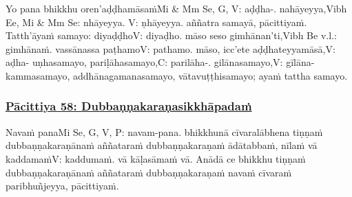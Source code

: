 Yo pana bhikkhu oren'aḍḍhamāsaṁ\makeatletter\hyperlink{endnote-appendix}\makeatother Mi & Mm Se, G, V: aḍḍha-. nahāyeyya,\makeatletter\hyperlink{endnote-appendix}\makeatother Vibh Ee, Mi & Mm Se: nhāyeyya. V: ṇhāyeyya. aññatra samayā, pācittiyaṁ. Tatth'āyaṁ samayo: diyaḍḍho\makeatletter\hyperlink{endnote-appendix}\makeatother V: diyaḍho. māso seso gimhānan'ti,\makeatletter\hyperlink{endnote-appendix}\makeatother Vibh Be v.l.: gimhānaṁ. vassānassa paṭhamo\makeatletter\hyperlink{endnote-appendix}\makeatother V: pathamo. māso, icc'ete aḍḍhateyyamāsā,\makeatletter\hyperlink{endnote-appendix}\makeatother V: aḍha- uṇhasamayo, pariḷāhasamayo,\makeatletter\hyperlink{endnote-appendix}\makeatother C: parilāha-. gilānasamayo,\makeatletter\hyperlink{endnote-appendix}\makeatother V: gīlāna- kammasamayo, addhānagamanasamayo, vātavuṭṭhisamayo; ayaṁ tattha samayo.



\subsubsection*{\hyperref[exp58]{Pācittiya 58: Dubbaṇṇakaraṇasikkhāpadaṁ}}
\label{pac58}

Navaṁ pana\makeatletter\hyperlink{endnote-appendix}\makeatother Mi Se, G, V, P: navam-pana. bhikkhunā cīvaralābhena tiṇṇaṁ dubbaṇṇakaraṇānaṁ aññataraṁ dubbaṇṇakaraṇaṁ ādātabbaṁ, nīlaṁ vā kaddamaṁ\makeatletter\hyperlink{endnote-appendix}\makeatother V: kaddumaṁ. vā kāḷasāmaṁ vā. Anādā ce bhikkhu tiṇṇaṁ dubbaṇṇakaraṇānaṁ aññataraṁ dubbaṇṇakaraṇaṁ navaṁ cīvaraṁ paribhuñjeyya, pācittiyaṁ.



